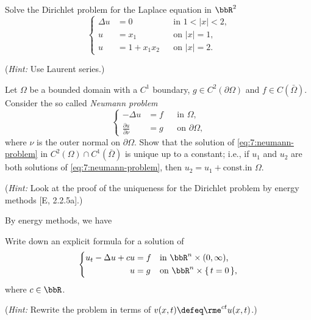 \begin{problem}
  Solve the Dirichlet problem for the Laplace equation in \(\bbR^2\)
  \[
    \left\{
      \begin{aligned}
        \Delta u&=0&&\text{in \(1<|x|<2\),}\\
        u&=x_1&&\text{on \(|x|=1\),}\\
        u&=1+x_1x_2&&\text{on \(|x|=2\).}
      \end{aligned}
    \right.
  \]

  \noindent (\emph{Hint:} Use Laurent series.)
\end{problem}
\begin{solution}
\end{solution}
\newpage

\begin{problem}
  Let \(\Omega\) be a bounded domain with a \(C^1\) boundary, \(g\in
  C^2(\partial\Omega)\) and \(f\in C(\bar\Omega)\). Consider the so called
  \emph{Neumann problem}
  \[
    \label{eq:7:neumann-problem}%
    \tag{\(*\)}%
    \left\{
      \begin{aligned}
        -\Delta u&=f&&\text{in \(\Omega\),}\\
        \frac{\partial u}{\partial\nu}&=g&&\text{on \(\partial\Omega\),}
      \end{aligned}
    \right.
  \]
  where \(\nu\) is the outer normal on \(\partial\Omega\). Show that the
  solution of \eqref{eq:7:neumann-problem} in
  \(C^2(\Omega)\cap C^1(\bar\Omega)\) is unique up to a constant; i.e., if
  \(u_1\) and \(u_2\) are both solutions of \eqref{eq:7:neumann-problem},
  then \(u_2=u_1+\text{const.}\)\@ in \(\Omega\).

  \noindent (\emph{Hint:} Look at the proof of the uniqueness for the
  Dirichlet problem by energy methods [E, 2.2.5a].)
\end{problem}
\begin{solution}
  By energy methods, we have
\end{solution}
\newpage

\begin{problem}
  Write down an explicit formula for a solution of
  \[
    \left\{
      \begin{aligned}
        u_t-\Delta u+cu&=f&&\text{in \(\bbR^n\times(0,\infty)\),}\\
        u&=g&&\text{on \(\bbR^n\times\{\,t=0\,\}\),}
      \end{aligned}
    \right.
  \]
  where \(c\in\bbR\).

  \noindent (\emph{Hint:} Rewrite the problem in terms of
  \(v(x,t)\defeq\rme^{ct}u(x,t)\).)
\end{problem}
\begin{solution}
\end{solution}

